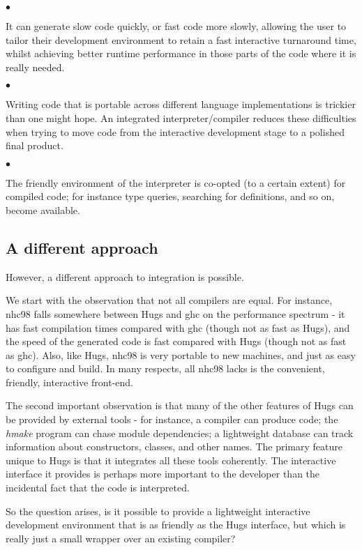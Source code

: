 \documentclass[a4paper]{article}
\begin{document}
$\bullet$
  \parbox[t]{11cm}{
    It can generate slow code quickly, or fast code more slowly,
      allowing the user to tailor their development environment
      to retain a fast interactive turnaround time, whilst achieving
      better runtime performance in those parts of the code where it
      is really needed.}

$\bullet$
  \parbox[t]{11cm}{
    Writing code that is portable across different language implementations
      is trickier than one might hope.  An integrated interpreter/compiler
      reduces these difficulties when trying to move code from the
      interactive development stage to a polished final product.}

$\bullet$
  \parbox[t]{11cm}{
    The friendly environment of the interpreter is co-opted (to a
      certain extent) for compiled code; for instance type queries,
      searching for definitions, and so on, become available.}


\subsection*{A different approach}
\noindent
However, a different approach to integration is possible.

We start with the observation that not all compilers are equal.
For instance, nhc98 falls somewhere between Hugs and ghc on the
performance spectrum - it has fast compilation times compared with
ghc (though not as fast as Hugs), and the speed of the generated
code is fast compared with Hugs (though not as fast as ghc).  Also,
like Hugs, nhc98 is very portable to new machines, and just as easy
to configure and build.  In many respects, all nhc98 lacks is the
convenient, friendly, interactive front-end.

The second important observation is that many of the other features
of Hugs can be provided by external tools - for instance, a compiler
can produce code; the {\em hmake} program can chase module dependencies;
a lightweight database can track information about constructors,
classes, and other names.  The primary feature unique to Hugs is that
it integrates all these tools coherently.  The interactive interface
it provides is perhaps more important to the developer than the
incidental fact that the code is interpreted.

So the question arises, is it possible to provide a lightweight
interactive development environment that is as friendly as the Hugs
interface, but which is really just a small wrapper over an existing
compiler?
\end{document}
